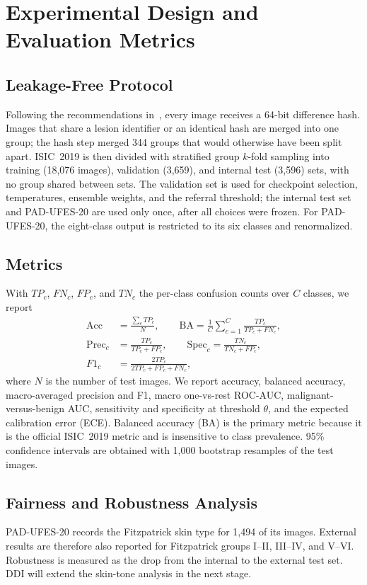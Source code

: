 \section{Experimental Design and Evaluation Metrics}\label{sec:exp}
\subsection{Leakage-Free Protocol}
Following the recommendations in~\cite{cassidy2022isic}, every image
receives a 64-bit difference hash. Images that share a lesion
identifier or an identical hash are merged into one group; the hash
step merged 344 groups that would otherwise have been split apart.
ISIC~2019 is then divided with stratified group $k$-fold sampling into
training (18{,}076 images), validation (3{,}659), and internal test
(3{,}596) sets, with no group shared between sets. The validation set is
used for checkpoint selection, temperatures, ensemble weights, and the
referral threshold; the internal test set and PAD-UFES-20 are used only
once, after all choices were frozen. For PAD-UFES-20, the eight-class
output is restricted to its six classes and renormalized.

\subsection{Metrics}
With $TP_c$, $FN_c$, $FP_c$, and $TN_c$ the per-class confusion counts
over $C$ classes, we report
\begin{align}
\mathrm{Acc} &= \frac{\sum_c TP_c}{N},\qquad
\mathrm{BA} = \frac{1}{C}\sum_{c=1}^{C}\frac{TP_c}{TP_c+FN_c},\\
\mathrm{Prec}_c &= \frac{TP_c}{TP_c+FP_c},\qquad
\mathrm{Spec}_c = \frac{TN_c}{TN_c+FP_c},\\
F1_c &= \frac{2TP_c}{2TP_c+FP_c+FN_c},
\end{align}
where $N$ is the number of test images. We report accuracy, balanced
accuracy, macro-averaged precision and F1, macro one-vs-rest ROC-AUC,
malignant-versus-benign AUC, sensitivity and specificity at threshold
$\theta$, and the expected calibration error (ECE). Balanced accuracy
(BA) is the primary metric because it is the official ISIC~2019 metric
and is insensitive to class prevalence. 95\% confidence intervals are
obtained with 1{,}000 bootstrap resamples of the test images.

\subsection{Fairness and Robustness Analysis}
PAD-UFES-20 records the Fitzpatrick skin type for 1{,}494 of its images.
External results are therefore also reported for Fitzpatrick groups
I--II, III--IV, and V--VI. Robustness is measured as the drop from the
internal to the external test set. DDI will extend the skin-tone
analysis in the next stage.


